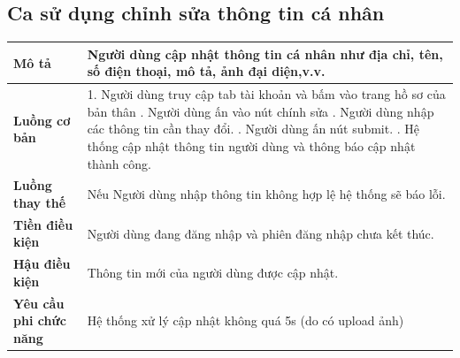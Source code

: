 \subsection{Ca sử dụng chỉnh sửa thông tin cá nhân}
\vspace{0.5cm}


\noindent 
\begin{tabularx}{\linewidth}{| l | X |} 
\hline 
\textbf{Mô tả} & Người dùng cập nhật thông tin cá nhân như
địa chỉ, tên, số điện thoại, mô tả, ảnh đại diện,v.v. \\ 
\hline 
\textbf{Luồng cơ bản} & 1. Người dùng truy cập tab tài khoản và bấm vào trang hồ sơ của bản thân \newline
                       2. Người dùng ấn vào nút chính sửa \newline
                       3. Người dùng nhập các thông tin cần thay đổi. \newline
                       5. Người dùng ấn nút submit. \newline
                       6. Hệ thống cập nhật thông tin người dùng và thông báo cập nhật thành công. \\
\hline 
\textbf{Luồng thay thế} & Nếu Người dùng nhập thông tin không hợp lệ hệ thống sẽ báo lỗi. \\
\hline 
\textbf{Tiền điều kiện} & Người dùng đang đăng nhập và phiên đăng nhập chưa kết thúc. \\
\hline 
\textbf{Hậu điều kiện} & Thông tin mới của người dùng được cập nhật. \\

\hline 
\textbf{Yêu cầu phi chức năng} & Hệ thống xử lý cập nhật không quá 5s (do có upload ảnh) \\ 
\hline 
\end{tabularx}

\vspace{0.8cm}

